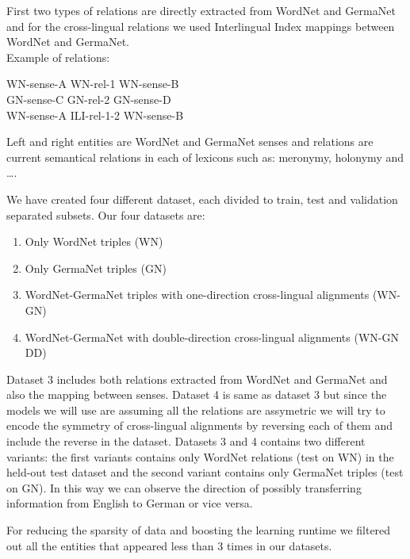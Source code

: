 \documentclass[11pt]{article}
\begin{document}
First two types of relations are directly extracted from WordNet and GermaNet and for the 
cross-lingual relations we used Interlingual Index mappings between WordNet and GermaNet.
\\
Example of relations:
\begin{center}
WN-sense-A \hspace{0.3in}  WN-rel-1    \hspace{0.3in}  WN-sense-B\\
GN-sense-C \hspace{0.3in}  GN-rel-2    \hspace{0.3in}  GN-sense-D\\
WN-sense-A \hspace{0.3in}  ILI-rel-1-2 \hspace{0.3in}  WN-sense-B\\
\end{center}

Left and right entities are WordNet and GermaNet senses and relations are current semantical relations in each of lexicons such as:
 meronymy, holonymy and \ldots.
 
 We have created four different dataset, each divided to train, test and validation separated subsets. Our four datasets are:
 \begin{enumerate}
 \item Only WordNet triples (WN)
 \item Only GermaNet triples (GN)
 \item WordNet-GermaNet triples with one-direction cross-lingual alignments (WN-GN)
 \item WordNet-GermaNet with double-direction cross-lingual alignments (WN-GN DD)
 \end{enumerate}
 
 Dataset 3 includes both relations extracted from WordNet and GermaNet and also the mapping between senses.
 Dataset 4 is same as dataset 3 but since the models we will use are assuming all the relations are assymetric 
 we will try to encode the symmetry of cross-lingual alignments by reversing each of them and include the reverse in the dataset.
 Datasets 3 and 4 contains two different variants: the first variants contains only WordNet relations (test on WN) 
 in the held-out test dataset and the second variant contains only GermaNet triples (test on GN).
  In this way we can observe the direction of
  possibly transferring information from English to German or vice versa.
  
  For reducing the sparsity of data and boosting the learning runtime we 
  filtered out all the entities that appeared less than 3 times in our datasets.
   
\end{document}
